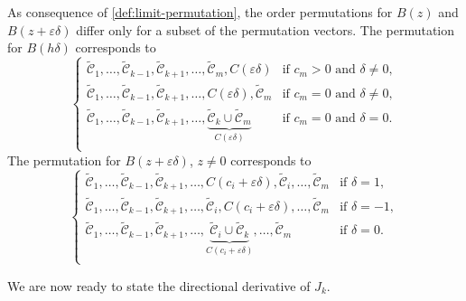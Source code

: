\begin{remark}
  As consequence of \cref{def:limit-permutation}, the order
  permutations for \(B(z)\) and \(B(z + \varepsilon \delta)\) differ only for a subset of
  the permutation vectors. The permutation for \(B(h\delta)\) corresponds to
  \[
    \begin{cases}
      \tilde{\mathcal{C}}_1, \dots, \tilde{\mathcal{C}}_{k-1}, \tilde{\mathcal{C}}_{k+1}, \dots, \tilde{\mathcal{C}}_m, C(\varepsilon\delta)                                          & \text{if } c_m > 0 \text{ and } \delta \neq 0, \\
      \tilde{\mathcal{C}}_1, \dots, \tilde{\mathcal{C}}_{k-1}, \tilde{\mathcal{C}}_{k+1}, \dots, C(\varepsilon\delta), \tilde{\mathcal{C}}_m                                          & \text{if } c_m = 0 \text{ and } \delta \neq 0, \\
      \tilde{\mathcal{C}}_1, \dots, \tilde{\mathcal{C}}_{k-1}, \tilde{\mathcal{C}}_{k+1}, \dots, \underbrace{\tilde{\mathcal{C}}_k \cup \tilde{\mathcal{C}}_m}_{C(\varepsilon\delta)} & \text{if } c_m = 0 \text{ and } \delta = 0.    \\
    \end{cases}
  \]
  The permutation for \(B(z + \varepsilon \delta)\), \(z \neq 0\) corresponds to
  \[
    \begin{cases}
      \tilde{\mathcal{C}}_1, \dots, \tilde{\mathcal{C}}_{k-1}, \tilde{\mathcal{C}}_{k+1}, \dots, C(c_i + \varepsilon\delta), \tilde{\mathcal{C}}_i, \dots, \tilde{\mathcal{C}}_m                                          & \text{if } \delta = 1,  \\
      \tilde{\mathcal{C}}_1, \dots, \tilde{\mathcal{C}}_{k-1}, \tilde{\mathcal{C}}_{k+1}, \dots, \tilde{\mathcal{C}}_i, C(c_i + \varepsilon\delta), \dots, \tilde{\mathcal{C}}_m                                          & \text{if } \delta = -1, \\
      \tilde{\mathcal{C}}_1, \dots, \tilde{\mathcal{C}}_{k-1}, \tilde{\mathcal{C}}_{k+1}, \dots, \underbrace{\tilde{\mathcal{C}}_i \cup \tilde{\mathcal{C}}_k}_{C(c_i + \varepsilon\delta)}, \dots, \tilde{\mathcal{C}}_m & \text{if } \delta = 0.  \\
    \end{cases}
  \]
\end{remark}

We are now ready to state the directional derivative of \(J_k\).

